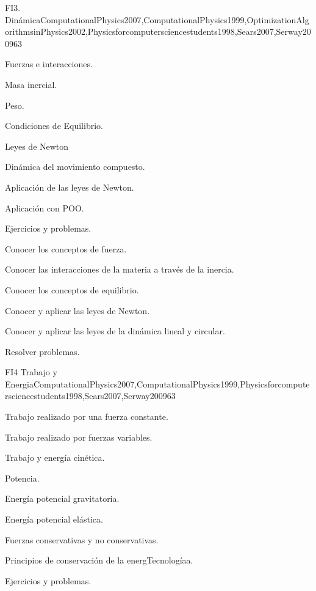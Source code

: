 \begin{syllabus}
\begin{unit}{FI3. Dinámica}{ComputationalPhysics2007,ComputationalPhysics1999,OptimizationAlgorithmsinPhysics2002,Physicsforcomputersciencestudents1998,Sears2007,Serway2009}{6}{3}
\begin{topics}
      \item Fuerzas e interacciones.
      \item Masa inercial.
      \item Peso.
      \item Condiciones de Equilibrio.
      \item Leyes de Newton
      \item Dinámica del movimiento compuesto.
      \item Aplicación de las leyes de Newton.
      \item Aplicación con POO.
      \item Ejercicios y problemas.
   \end{topics}

   \begin{unitgoals}
      \item Conocer los conceptos de fuerza.
      \item Conocer las interacciones de la materia a través de la inercia.
      \item Conocer los conceptos de equilibrio.
      \item Conocer y aplicar las leyes de Newton.      
      \item Conocer y aplicar las leyes de la dinámica lineal y circular.
      \item Resolver problemas.
   \end{unitgoals}
\end{unit}

\begin{unit}{FI4 Trabajo y Energia}{ComputationalPhysics2007,ComputationalPhysics1999,Physicsforcomputersciencestudents1998,Sears2007,Serway2009}{6}{3}
\begin{topics}
      \item Trabajo realizado por una fuerza constante.
      \item Trabajo realizado por fuerzas variables.
      \item Trabajo y energía cinética.
      \item Potencia.
      \item Energía potencial gravitatoria.
      \item Energía potencial elástica.
      \item Fuerzas conservativas y no conservativas.
      \item Principios de conservación de la energTecnologíaa.
      \item Ejercicios y problemas.
   \end{topics}


\end{unit}
\end{syllabus}
